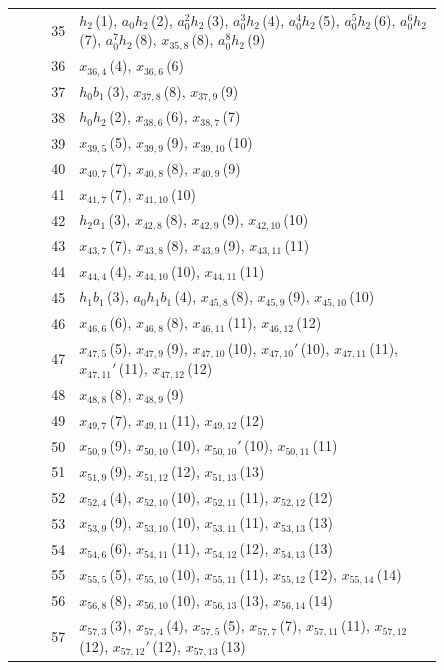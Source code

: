 \documentclass[11pt]{article}
\begin{document}
\begin{center}
\begin{longtable}{r>{\raggedright\arraybackslash}p{0.85\linewidth}}
35 & $h_2$\,(1), $a_0h_2$\,(2), $a_0^2h_2$\,(3), $a_0^3h_2$\,(4), $a_0^4h_2$\,(5), $a_0^5h_2$\,(6), $a_0^6h_2$\,(7), $a_0^7h_2$\,(8), $x_{35,8}$\,(8), $a_0^8h_2$\,(9) \\
36 & $x_{36,4}$\,(4), $x_{36,6}$\,(6) \\
37 & $h_0b_1$\,(3), $x_{37,8}$\,(8), $x_{37,9}$\,(9) \\
38 & $h_0h_2$\,(2), $x_{38,6}$\,(6), $x_{38,7}$\,(7) \\
39 & $x_{39,5}$\,(5), $x_{39,9}$\,(9), $x_{39,10}$\,(10) \\
40 & $x_{40,7}$\,(7), $x_{40,8}$\,(8), $x_{40,9}$\,(9) \\
41 & $x_{41,7}$\,(7), $x_{41,10}$\,(10) \\
42 & $h_2a_1$\,(3), $x_{42,8}$\,(8), $x_{42,9}$\,(9), $x_{42,10}$\,(10) \\
43 & $x_{43,7}$\,(7), $x_{43,8}$\,(8), $x_{43,9}$\,(9), $x_{43,11}$\,(11) \\
44 & $x_{44,4}$\,(4), $x_{44,10}$\,(10), $x_{44,11}$\,(11) \\
45 & $h_1b_1$\,(3), $a_0h_1b_1$\,(4), $x_{45,8}$\,(8), $x_{45,9}$\,(9), $x_{45,10}$\,(10) \\
46 & $x_{46,6}$\,(6), $x_{46,8}$\,(8), $x_{46,11}$\,(11), $x_{46,12}$\,(12) \\
47 & $x_{47,5}$\,(5), $x_{47,9}$\,(9), $x_{47,10}$\,(10), $x_{47,10}'$\,(10), $x_{47,11}$\,(11), $x_{47,11}'$\,(11), $x_{47,12}$\,(12) \\
48 & $x_{48,8}$\,(8), $x_{48,9}$\,(9) \\
49 & $x_{49,7}$\,(7), $x_{49,11}$\,(11), $x_{49,12}$\,(12) \\
50 & $x_{50,9}$\,(9), $x_{50,10}$\,(10), $x_{50,10}'$\,(10), $x_{50,11}$\,(11) \\
51 & $x_{51,9}$\,(9), $x_{51,12}$\,(12), $x_{51,13}$\,(13) \\
52 & $x_{52,4}$\,(4), $x_{52,10}$\,(10), $x_{52,11}$\,(11), $x_{52,12}$\,(12) \\
53 & $x_{53,9}$\,(9), $x_{53,10}$\,(10), $x_{53,11}$\,(11), $x_{53,13}$\,(13) \\
54 & $x_{54,6}$\,(6), $x_{54,11}$\,(11), $x_{54,12}$\,(12), $x_{54,13}$\,(13) \\
55 & $x_{55,5}$\,(5), $x_{55,10}$\,(10), $x_{55,11}$\,(11), $x_{55,12}$\,(12), $x_{55,14}$\,(14) \\
56 & $x_{56,8}$\,(8), $x_{56,10}$\,(10), $x_{56,13}$\,(13), $x_{56,14}$\,(14) \\
57 & $x_{57,3}$\,(3), $x_{57,4}$\,(4), $x_{57,5}$\,(5), $x_{57,7}$\,(7), $x_{57,11}$\,(11), $x_{57,12}$\,(12), $x_{57,12}'$\,(12), $x_{57,13}$\,(13) \\

\end{longtable}
\end{center}
\end{document}
